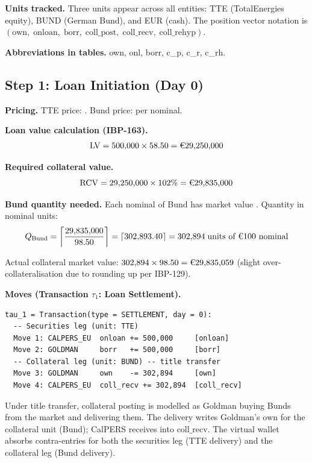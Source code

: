 \documentclass[11pt,a4paper]{article}
\newcommand{\EUR}[1]{\texteuro#1}
\begin{document}
\medskip
\noindent\textbf{Units tracked.} Three units appear across all entities: TTE (TotalEnergies equity), BUND (German Bund), and EUR (cash). The position vector notation is $(\mathrm{own},\; \mathrm{onloan},\; \mathrm{borr},\; \mathrm{coll\_post},\; \mathrm{coll\_recv},\; \mathrm{coll\_rehyp})$.

\medskip
\noindent\textbf{Abbreviations in tables.} own, onl, borr, c\_p, c\_r, c\_rh.

\subsection{Step 1: Loan Initiation (Day 0)}
\label{sec:eu-step1}

\noindent\textbf{Pricing.} TTE price: \EUR{58.50}. Bund price: \EUR{98.50} per \EUR{100} nominal.

\medskip
\noindent\textbf{Loan value calculation (IBP-163).}
\[
\mathrm{LV} = 500{,}000 \times 58.50 = \text{\EUR{29,250,000}}
\]

\noindent\textbf{Required collateral value.}
\[
\mathrm{RCV} = 29{,}250{,}000 \times 102\% = \text{\EUR{29,835,000}}
\]

\noindent\textbf{Bund quantity needed.} Each \EUR{100} nominal of Bund has market value \EUR{98.50}. Quantity in \EUR{100} nominal units:
\[
Q_{\mathrm{Bund}} = \left\lceil \frac{29{,}835{,}000}{98.50} \right\rceil = \left\lceil 302{,}893.40 \right\rceil = 302{,}894 \;\text{units of \EUR{100} nominal}
\]

\noindent Actual collateral market value: $302{,}894 \times 98.50 = \text{\EUR{29,835,059}}$ (slight over-collateralisation due to rounding up per IBP-129).

\medskip
\noindent\textbf{Moves (Transaction $\tau_1$: Loan Settlement).}

\begin{lstlisting}
tau_1 = Transaction(type = SETTLEMENT, day = 0):
  -- Securities leg (unit: TTE)
  Move 1: CALPERS_EU  onloan += 500,000     [onloan]
  Move 2: GOLDMAN     borr   += 500,000     [borr]
  -- Collateral leg (unit: BUND) -- title transfer
  Move 3: GOLDMAN     own    -= 302,894     [own]
  Move 4: CALPERS_EU  coll_recv += 302,894  [coll_recv]
\end{lstlisting}

\noindent Under title transfer, collateral posting is modelled as Goldman buying Bunds from the market and delivering them. The delivery writes Goldman's $\mathrm{own}$ for the collateral unit (Bund); CalPERS receives into $\mathrm{coll\_recv}$. The virtual wallet absorbs contra-entries for both the securities leg (TTE delivery) and the collateral leg (Bund delivery).
\end{document}
